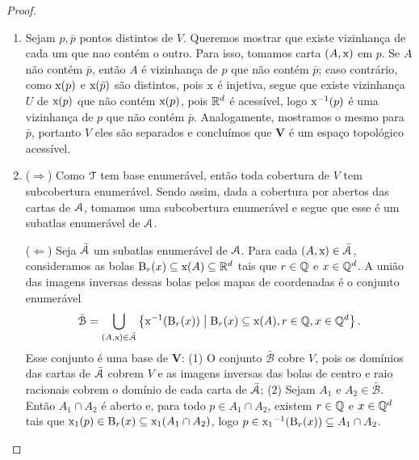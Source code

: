 \begin{proof}
	\begin{enumerate}
	\item Sejam $p,\bar p$ pontos distintos de $V$. Queremos mostrar que existe vizinhança de cada um que nao contém o outro. Para isso, tomamos carta $(A,\mathrm{x})$ em $p$. Se $A$ não contém $\bar p$, então $A$ é vizinhança de $p$ que não contém $\bar p$; caso contrário, como $\mathrm{x}(p)$ e $\mathrm{x}(\bar p)$ são distintos, pois $\mathrm{x}$ é injetiva, segue que existe vizinhança $U$ de $\mathrm{x}(p)$ que não contém $\mathrm{x}(p)$, pois $\mathbb{R}^d$ é acessível, logo $\mathrm{x}^{-1}(p)$ é uma vizinhança de $p$ que não contém $\bar p$. Analogamente, mostramos o mesmo para $\bar p$, portanto $V$ eles são separados e concluímos que $\bm V$ é um espaço topológico acessível.
	
	\item ($\Rightarrow$) Como $\mathcal{T}$ tem base enumerável, então toda cobertura de $V$ tem subcobertura enumerável. Sendo assim, dada a cobertura por abertos das cartas de $\mathcal{A}$, tomamos uma subcobertura enumerável e segue que esse é um subatlas enumerável de $\mathcal{A}$.

($\Leftarrow$) Seja $\bar {\mathcal{A}}$ um subatlas enumerável de $\mathcal{A}$. Para cada $(A,\mathrm{x}) \in \bar {\mathcal{A}}$, consideramos as bolas $\mathrm{B}_r(x) \subseteq \mathrm{x}(A) \subseteq \mathbb{R}^d$ tais que $r \in \mathbb{Q}$ e $x \in \mathbb{Q}^d$. A união das imagens inversas dessas bolas pelos mapas de coordenadas é o conjunto enumerável
	\begin{equation*}
	\bar{\mathcal B} = \bigcup_{(A,\mathrm{x}) \in \bar {\mathcal{A}}} \left\{\mathrm{x}^{-1}(\mathrm{B}_r(x)) \;\middle\vert\; \mathrm{B}_r(x) \subseteq \mathrm{x}(A),  r \in \mathbb{Q}, x \in \mathbb{Q}^d \right\}.
	\end{equation*}
Esse conjunto é uma base de $\bm V$: (1) O conjunto $\bar{\mathcal B}$ cobre $V$, pois os domínios das cartas de $\bar{\mathcal{A}}$ cobrem $V$ e as imagens inversas das bolas de centro e raio racionais cobrem o domínio de cada carta de $\bar{\mathcal{A}}$; (2) Sejam $A_1$ e $A_2 \in \bar{\mathcal B}$. Então $A_1 \cap A_2$ é aberto e, para todo $p \in A_1 \cap A_2$, existem $r \in \mathbb{Q}$ e $x \in \mathbb{Q}^d$ tais que $\mathrm{x}_1(p) \in \mathrm{B}_{r}(x) \subseteq \mathrm{x}_1(A_1 \cap A_2)$, logo $p \in {\mathrm{x}_1}^{-1}(\mathrm{B}_r(x)) \subseteq A_1 \cap A_2$.
	

\end{enumerate}
\end{proof}
